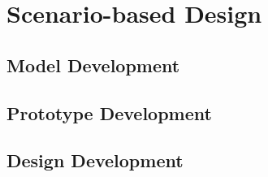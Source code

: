 



\chapter{Scenario-based Design} \label{ScenarioBasedDesign}


\section{Model Development} \label{ModDev}







\section{Prototype Development} \label{ProtDev}




\section{Design Development} \label{DesDev}



	
		
		

